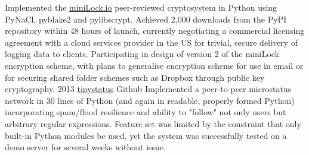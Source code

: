 \documentclass[]{friggeri-cv} %
\begin{document}
\begin{entrylist}
{Implemented the \href{https://minilock.io}{miniLock.io} peer-reviewed cryptosystem
in Python using PyNaCl, pyblake2 and pylibscrypt. Achieved 2,000 downloads from the PyPI
repository within 48 hours of launch, currently negotiating a commercial licensing
agreement with a cloud services provider in the US for trivial, secure delivery of logging 
data to clients.
Participating in design of version 2 of the miniLock encryption scheme, with plans to
generalise encryption scheme for use in email or for securing shared folder schemes such
as Dropbox through public key cryptography.
}
\entry
{2013}
{\href{https://github.com/cathalgarvey/tinystatus}{tinystatus}}
{Github}
{Implemented a peer-to-peer microstatus network in 30 lines of Python (and again in
readable, properly formed Python) incorporating spam/flood resilience and ability
to "follow" not only users but arbitrary regular expressions. Feature set was limited
by the constraint that only built-in Python modules be used, yet the system was successfully
tested on a demo server for several weeks without issue.
}
\end{entrylist}

\pagebreak
\end{document}
